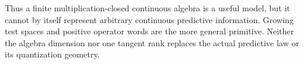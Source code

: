Thus a finite multiplication-closed continuous algebra is a useful model,
but it cannot by itself represent arbitrary continuous predictive
information. Growing test spaces and positive operator words are the
more general primitive. Neither the algebra dimension nor one tangent rank
replaces the actual predictive law or its quantization geometry.
